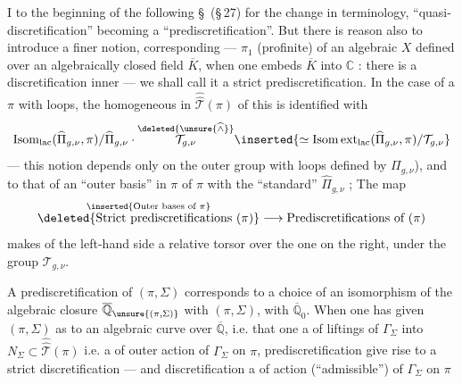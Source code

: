 I  to the beginning of the following \S\ (\S\,27) for the
change in terminology, ``quasi-discretification''
becoming a ``prediscretification''. But there is reason
also to introduce a finer notion, corresponding
---   $\pi_1$ (profinite) of an algebraic 
$X$ defined over an algebraically closed field $\overline K$, when one embeds
$\overline K$ into $\mathbb C$ : there is a discretification 
inner  --- we shall call it a
strict prediscretification. In the case of a
$\pi$ with loops, the homogeneous   in $\widehat{\widehat{\mathcal T}}(\pi)$ of this is identified with
\[
\operatorname{Isom}_{\mathrm{lac}}(\widehat{\Pi}_{g,\nu},\pi)/\widehat{\Pi}_{g,\nu}\cdot
\overset{\deleted{\unsure{\widehat{\wedge}}}}{\mathcal T_{g,\nu}}
\inserted{\simeq\operatorname{Isom\,ext}_{\mathrm{lac}}(\widehat{\Pi}_{g,\nu},\pi)/\mathcal T_{g,\nu}}
\]
--- this notion  depends only on the outer  group with loops
defined by $\Pi_{g,\nu}$), and  
to that of an ``outer basis'' in $\pi$
of $\pi$ with the ``standard'' $\widehat{\Pi}_{g,\nu}$ ;
The map
\[
\overset{\inserted{\text{Outer bases of }\pi}}{\deleted{\text{Strict prediscretifications }(\pi)}}
\longrightarrow \text{Prediscretifications of }(\pi)
\]
makes  of the left-hand side a relative torsor
 over the one on the right, under the group $\mathcal T_{g,\nu}$.

A prediscretification of $(\pi,\Sigma)$ corresponds to a
choice of an isomorphism of the algebraic closure $\overline{\mathbb Q}_{\unsure{(\pi,\Sigma)}}$  
with $(\pi,\Sigma)$, with $\overline{\mathbb Q}_0$. When one has given $(\pi,\Sigma)$ as
 to an algebraic curve over $\overline{\mathbb Q}$, i.e. that one
 a  of liftings of $\Gamma_\Sigma$ into $N_\Sigma\subset\widehat{\widehat{\mathcal T}}(\pi)$
i.e. a  of outer action of $\Gamma_\Sigma$ on $\pi$, 
prediscretification  give rise to a strict
discretification --- and   discretification  
a  of action (``admissible'') of $\Gamma_\Sigma$ on $\pi$ \unsure{\ldots}

